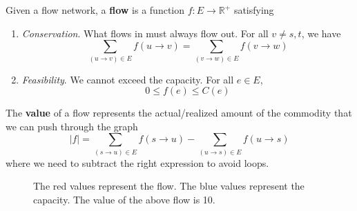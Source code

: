   \begin{definition}[Flow]
    Given a flow network, a \textbf{flow} is a function $f: E \rightarrow \mathbb{R}^+$ satisfying 
    \begin{enumerate}
      \item \textit{Conservation}. What flows in must always flow out. For all $v \neq s, t$, we have 
        \begin{equation}
          \sum_{(u \rightarrow v) \in E} f(u \rightarrow v) = \sum_{(v \rightarrow w) \in E} f(v \rightarrow w)
        \end{equation}

      \item \textit{Feasibility}. We cannot exceed the capacity. For all $e \in E$, 
        \begin{equation}
          0 \leq f(e) \leq C(e)
        \end{equation}
    \end{enumerate}
    The \textbf{value} of a flow represents the actual/realized amount of the commodity that we can push through the graph
    \begin{equation}
      |f| = \sum_{(s \rightarrow u) \in E}  f(s \rightarrow u) - \sum_{(u \rightarrow s) \in E}  f(u \rightarrow s) 
    \end{equation} 
    where we need to subtract the right expression to avoid loops. 

    \begin{figure}[H]
      \centering
      \caption{The red values represent the flow. The blue values represent the capacity. The value of the above flow is 10.} 
      \label{fig:flow}
    \end{figure}
  \end{definition}

